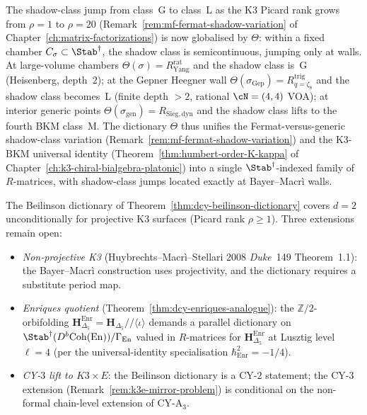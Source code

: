 \begin{remark}
\label{rem:dcy-chamber-shadow-flow}
The shadow-class jump from class~G to class~L as the K3 Picard rank
grows from $\rho=1$ to $\rho=20$
(Remark~\ref{rem:mf-fermat-shadow-variation} of
Chapter~\ref{ch:matrix-factorizations}) is now globalised by
$\Theta$: within a fixed chamber $C_\sigma\subset\Stab^\dagger$, the
shadow class is semicontinuous, jumping only at walls. At
large-volume chambers $\Theta(\sigma)=R^{\mathrm{rat}}_{\mathrm{Yang}}$
and the shadow class is~G (Heisenberg, depth~$2$); at the Gepner
Heegner wall $\Theta(\sigma_{\mathrm{Gep}})=R^{\mathrm{trig}}_{q=\zeta_8}$
and the shadow class becomes~L (finite depth $>2$, rational
$\cN=(4,4)$ VOA); at interior generic points
$\Theta(\sigma_{\mathrm{gen}})=R_{\mathrm{Sieg,dyn}}$ and the shadow
class lifts to the fourth BKM class~M. The dictionary $\Theta$ thus unifies the
Fermat-versus-generic shadow-class variation
(Remark~\ref{rem:mf-fermat-shadow-variation}) and the
K3-BKM universal identity
(Theorem~\ref{thm:humbert-order-K-kappa} of
Chapter~\ref{ch:k3-chiral-bialgebra-platonic}) into a single
$\Stab^\dagger$-indexed family of $R$-matrices, with shadow-class
jumps located exactly at Bayer--Macr\`i walls.
\end{remark}

\begin{remark}
\label{rem:dcy-bridgeland-scope}
The Beilinson dictionary of
Theorem~\ref{thm:dcy-beilinson-dictionary} covers
$d=2$ unconditionally for projective K3 surfaces (Picard rank
$\rho\ge 1$). Three extensions remain open:
\begin{itemize}
\item \emph{Non-projective K3} (Huybrechts--Macr\`i--Stellari 2008
 \emph{Duke}~149 Theorem~1.1): the Bayer--Macr\`i construction uses
 projectivity, and the dictionary requires a substitute period map.
\item \emph{Enriques quotient}
 (Theorem~\ref{thm:dcy-enriques-analogue}): the
 $\mathbb{Z}/2$-orbifolding $\mathbf{H}_{\Delta_5}^{\mathrm{Enr}}=
 \mathbf{H}_{\Delta_5}/\!/\langle\iota\rangle$ demands a parallel
 dictionary on $\Stab^\dagger(D^b\mathrm{Coh}(\mathrm{En}))/\Gamma_{\mathrm{En}}$
 valued in $R$-matrices for $\mathbf{H}_{\Delta_5}^{\mathrm{Enr}}$ at
 Lusztig level $\ell=4$ (per the universal-identity
 specialisation $\hbar_{\mathrm{Enr}}^2=-1/4$).
\item \emph{CY-$3$ lift to $K3\times E$}: the Beilinson dictionary is a
 CY-$2$ statement; the CY-$3$ extension
 (Remark~\ref{rem:k3e-mirror-problem}) is conditional on the
 non-formal chain-level extension of CY-A$_3$.
\end{itemize}
\end{remark}

